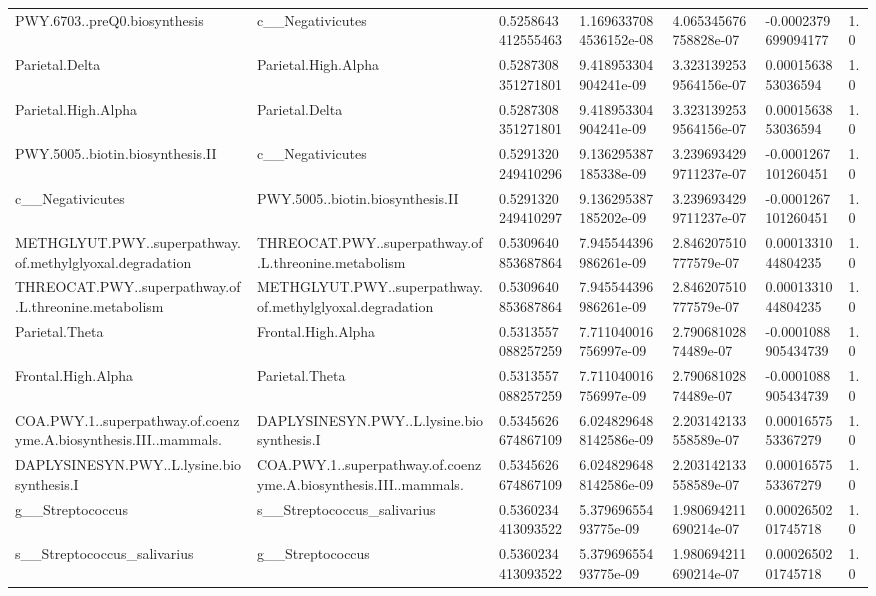 \begin{longtable}{lllllll}
PWY.6703..preQ0.biosynthesis & c\_\_Negativicutes & 0.5258643412555463 & 1.1696337084536152e-08 & 4.065345676758828e-07 & -0.0002379699094177 & 1.0 \\
Parietal.Delta & Parietal.High.Alpha & 0.5287308351271801 & 9.418953304904241e-09 & 3.3231392539564156e-07 & 0.0001563853036594 & 1.0 \\
Parietal.High.Alpha & Parietal.Delta & 0.5287308351271801 & 9.418953304904241e-09 & 3.3231392539564156e-07 & 0.0001563853036594 & 1.0 \\
PWY.5005..biotin.biosynthesis.II & c\_\_Negativicutes & 0.5291320249410296 & 9.136295387185338e-09 & 3.2396934299711237e-07 & -0.0001267101260451 & 1.0 \\
c\_\_Negativicutes & PWY.5005..biotin.biosynthesis.II & 0.5291320249410297 & 9.136295387185202e-09 & 3.2396934299711237e-07 & -0.0001267101260451 & 1.0 \\
METHGLYUT.PWY..superpathway.of.methylglyoxal.degradation & THREOCAT.PWY..superpathway.of.L.threonine.metabolism & 0.5309640853687864 & 7.945544396986261e-09 & 2.846207510777579e-07 & 0.0001331044804235 & 1.0 \\
THREOCAT.PWY..superpathway.of.L.threonine.metabolism & METHGLYUT.PWY..superpathway.of.methylglyoxal.degradation & 0.5309640853687864 & 7.945544396986261e-09 & 2.846207510777579e-07 & 0.0001331044804235 & 1.0 \\
Parietal.Theta & Frontal.High.Alpha & 0.5313557088257259 & 7.711040016756997e-09 & 2.79068102874489e-07 & -0.0001088905434739 & 1.0 \\
Frontal.High.Alpha & Parietal.Theta & 0.5313557088257259 & 7.711040016756997e-09 & 2.79068102874489e-07 & -0.0001088905434739 & 1.0 \\
COA.PWY.1..superpathway.of.coenzyme.A.biosynthesis.III..mammals. & DAPLYSINESYN.PWY..L.lysine.biosynthesis.I & 0.5345626674867109 & 6.0248296488142586e-09 & 2.203142133558589e-07 & 0.0001657553367279 & 1.0 \\
DAPLYSINESYN.PWY..L.lysine.biosynthesis.I & COA.PWY.1..superpathway.of.coenzyme.A.biosynthesis.III..mammals. & 0.5345626674867109 & 6.0248296488142586e-09 & 2.203142133558589e-07 & 0.0001657553367279 & 1.0 \\
g\_\_Streptococcus & s\_\_Streptococcus\_salivarius & 0.5360234413093522 & 5.37969655493775e-09 & 1.980694211690214e-07 & 0.0002650201745718 & 1.0 \\
s\_\_Streptococcus\_salivarius & g\_\_Streptococcus & 0.5360234413093522 & 5.37969655493775e-09 & 1.980694211690214e-07 & 0.0002650201745718 & 1.0 \\

\end{longtable}
